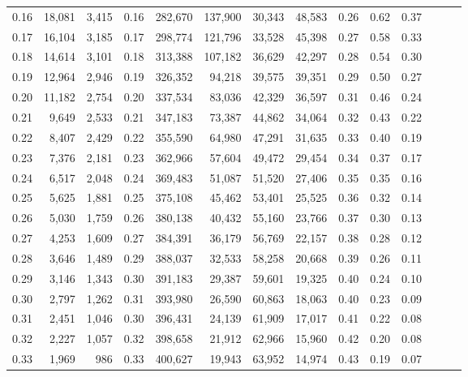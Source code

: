 \begin{tabular}{rrrrrrrrrrrrrr}
0.16 &  18,081 &  3,415 &  0.16 &  282,670 &  137,900 &  30,343 &  48,583 &  0.26 &  0.62 &      0.37 \\
0.17 &  16,104 &  3,185 &  0.17 &  298,774 &  121,796 &  33,528 &  45,398 &  0.27 &  0.58 &      0.33 \\
0.18 &  14,614 &  3,101 &  0.18 &  313,388 &  107,182 &  36,629 &  42,297 &  0.28 &  0.54 &      0.30 \\
0.19 &  12,964 &  2,946 &  0.19 &  326,352 &   94,218 &  39,575 &  39,351 &  0.29 &  0.50 &      0.27 \\
0.20 &  11,182 &  2,754 &  0.20 &  337,534 &   83,036 &  42,329 &  36,597 &  0.31 &  0.46 &      0.24 \\
0.21 &   9,649 &  2,533 &  0.21 &  347,183 &   73,387 &  44,862 &  34,064 &  0.32 &  0.43 &      0.22 \\
0.22 &   8,407 &  2,429 &  0.22 &  355,590 &   64,980 &  47,291 &  31,635 &  0.33 &  0.40 &      0.19 \\
0.23 &   7,376 &  2,181 &  0.23 &  362,966 &   57,604 &  49,472 &  29,454 &  0.34 &  0.37 &      0.17 \\
0.24 &   6,517 &  2,048 &  0.24 &  369,483 &   51,087 &  51,520 &  27,406 &  0.35 &  0.35 &      0.16 \\
0.25 &   5,625 &  1,881 &  0.25 &  375,108 &   45,462 &  53,401 &  25,525 &  0.36 &  0.32 &      0.14 \\
0.26 &   5,030 &  1,759 &  0.26 &  380,138 &   40,432 &  55,160 &  23,766 &  0.37 &  0.30 &      0.13 \\
0.27 &   4,253 &  1,609 &  0.27 &  384,391 &   36,179 &  56,769 &  22,157 &  0.38 &  0.28 &      0.12 \\
0.28 &   3,646 &  1,489 &  0.29 &  388,037 &   32,533 &  58,258 &  20,668 &  0.39 &  0.26 &      0.11 \\
0.29 &   3,146 &  1,343 &  0.30 &  391,183 &   29,387 &  59,601 &  19,325 &  0.40 &  0.24 &      0.10 \\
0.30 &   2,797 &  1,262 &  0.31 &  393,980 &   26,590 &  60,863 &  18,063 &  0.40 &  0.23 &      0.09 \\
0.31 &   2,451 &  1,046 &  0.30 &  396,431 &   24,139 &  61,909 &  17,017 &  0.41 &  0.22 &      0.08 \\
0.32 &   2,227 &  1,057 &  0.32 &  398,658 &   21,912 &  62,966 &  15,960 &  0.42 &  0.20 &      0.08 \\
0.33 &   1,969 &    986 &  0.33 &  400,627 &   19,943 &  63,952 &  14,974 &  0.43 &  0.19 &      0.07 \\

\end{tabular}
